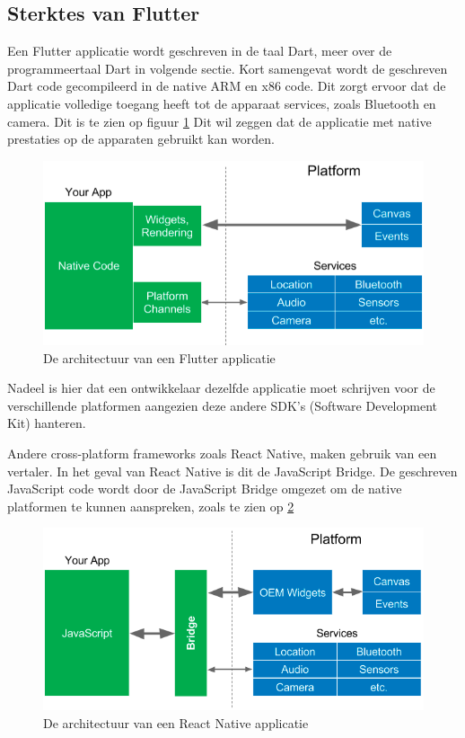 \subsection{Sterktes van Flutter}
Een Flutter applicatie wordt geschreven in de taal Dart, meer over de programmeertaal Dart in volgende sectie. Kort samengevat wordt de geschreven Dart code gecompileerd in de native ARM en x86 code. 
Dit zorgt ervoor dat de applicatie volledige toegang heeft tot de apparaat services, zoals Bluetooth en camera. Dit is te zien op figuur \ref{fig:flutter-app-architecture}
Dit wil zeggen dat de applicatie met native prestaties op de apparaten gebruikt kan worden.


\begin{figure}[H]
    \centering
    \includegraphics[width=\figureWidthModifier\linewidth]{img/stand-van-zaken/flutter-app-architecture.png}
    \caption{De architectuur van een Flutter applicatie}
    \label{fig:flutter-app-architecture}
\end{figure}

Nadeel is hier dat een ontwikkelaar dezelfde applicatie moet schrijven voor de verschillende platformen aangezien deze andere SDK's (Software Development Kit) hanteren. \autocite{Coninck2019}

Andere cross-platform frameworks zoals React Native, maken gebruik van een vertaler. In het geval van React Native is dit de JavaScript Bridge. De geschreven JavaScript code wordt door de JavaScript Bridge omgezet om de native platformen te kunnen aanspreken, zoals te zien op \ref{fig:react-native-app-architecture}  \autocite{Kuitunen2019}

\begin{figure}[H]
    \centering
    \includegraphics[width=\figureWidthModifier\linewidth]{img/stand-van-zaken/react-native-app-architecture.png}
    \caption{De architectuur van een React Native applicatie}
    \label{fig:react-native-app-architecture}
\end{figure}

